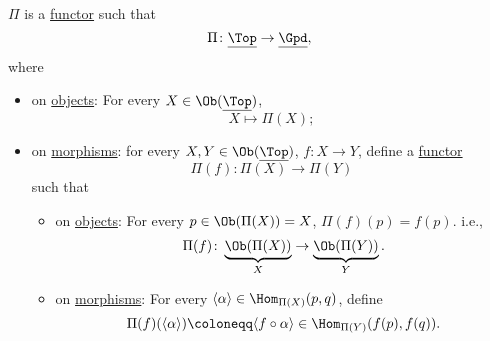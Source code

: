 \begin{theorem}\label{thm:fundamental-groupoid-defines-a-functor}
	\(\Pi\) is a \hyperref[def:functor]{functor} such that
	\[
		\Pi\colon \underline{\Top} \to \underline{\Gpd},
	\]
	where
	\begin{itemize}
		\item on \hyperref[def:object]{objects}: For every \(X\in \Ob (\underline{\Top})\),
		      \[
			      X\mapsto \Pi (X);
		      \]
		\item on \hyperref[def:morphism]{morphisms}: for every \(X, Y\in \Ob (\underline{\Top})\), \(f\colon X\to Y\), define a \hyperref[def:functor]{functor}
		      \[
			      \Pi (f)\colon \Pi(X)\to \Pi (Y)
		      \]
		      such that
		      \begin{itemize}
			      \item on \hyperref[def:object]{objects}: For every \(p\in \Ob (\Pi (X)) = X\), \(\Pi (f)(p) = f(p)\). i.e.,
			            \[
				            \Pi (f)\colon \underbrace{\Ob (\Pi (X))}_{X}\to \underbrace{\Ob (\Pi (Y))}_{Y}.
			            \]
			      \item on \hyperref[def:morphism]{morphisms}: For every \(\langle \alpha  \rangle \in \Hom _{\Pi (X)}(p, q)\), define
			            \[
				            \Pi (f)(\langle \alpha  \rangle )\coloneqq \langle f\circ \alpha  \rangle \in \Hom _{\Pi (Y)}(f(p), f(q)).
			            \]
		      \end{itemize}
	\end{itemize}
\end{theorem}

